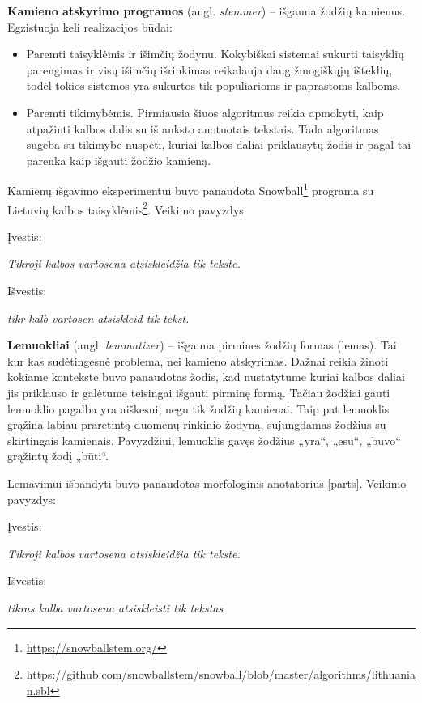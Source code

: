 \documentclass{VUMIFInfBakalaurinis}
\begin{document}

\textbf{Kamieno atskyrimo programos} (angl. \emph{stemmer}) -- išgauna
žodžių kamienus. Egzistuoja keli realizacijos būdai:

\begin{itemize}
\item
  Paremti taisyklėmis ir išimčių žodynu. Kokybiškai sistemai sukurti
  taisyklių parengimas ir visų išimčių išrinkimas reikalauja daug
  žmogiškųjų išteklių, todėl tokios sistemos yra sukurtos tik
  populiarioms ir paprastoms kalboms.
\item
  Paremti tikimybėmis. Pirmiausia šiuos algoritmus reikia apmokyti, kaip
  atpažinti kalbos dalis su iš anksto anotuotais tekstais. Tada
  algoritmas sugeba su tikimybe nuspėti, kuriai kalbos daliai priklausytų
  žodis ir pagal tai parenka kaip išgauti žodžio kamieną.
\end{itemize}

Kamienų išgavimo eksperimentui buvo panaudota Snowball\footnote{\url{https://snowballstem.org/}}
programa su Lietuvių kalbos taisyklėmis\footnote{\url{https://github.com/snowballstem/snowball/blob/master/algorithms/lithuanian.sbl}}.
Veikimo pavyzdys:

Įvestis:

\emph{Tikroji kalbos vartosena atsiskleidžia tik tekste.}

Išvestis:

\emph{tikr kalb vartosen atsiskleid tik tekst.}


\textbf{Lemuokliai} (angl. \emph{lemmatizer}) -- išgauna pirmines žodžių
formas (lemas). Tai kur kas sudėtingesnė problema, nei kamieno
atskyrimas. Dažnai reikia žinoti kokiame kontekste buvo panaudotas
žodis, kad nustatytume kuriai kalbos daliai jis priklauso ir galėtume
teisingai išgauti pirminę formą. Tačiau žodžiai gauti lemuoklio pagalba
yra aiškesni, negu tik žodžių kamienai. Taip pat lemuoklis grąžina
labiau praretintą duomenų rinkinio žodyną, sujungdamas žodžius su
skirtingais kamienais. Pavyzdžiui, lemuoklis gavęs žodžius „yra“,
„esu“, „buvo“ grąžintų žodį „būti“.

Lemavimui išbandyti buvo panaudotas morfologinis anotatorius \ref{parts}. Veikimo
pavyzdys:

Įvestis:

\emph{Tikroji kalbos vartosena atsiskleidžia tik tekste.}

Išvestis:

\emph{tikras kalba vartosena atsiskleisti tik tekstas}
\end{document}
